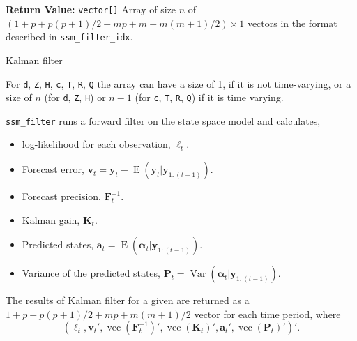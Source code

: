 \documentclass[]{book}
\providecommand{\tightlist}{%
  \setlength{\itemsep}{0pt}\setlength{\parskip}{0pt}}
\DeclareMathOperator{\E}{E}
\DeclareMathOperator{\Var}{Var}
\DeclareMathOperator{\VEC}{vec}
\newcommand{\mat}[1]{\boldsymbol{#1}}
\renewcommand{\vec}[1]{\boldsymbol{#1}}
\begin{document}
\textbf{Return Value:} \texttt{vector{[}{]}} Array of size \(n\) of
\((1 + p + p (p + 1) / 2 + mp + m + m (m + 1) / 2) \times 1\) vectors in
the format described in \texttt{ssm\_filter\_idx}.

Kalman filter

For \texttt{d}, \texttt{Z}, \texttt{H}, \texttt{c}, \texttt{T},
\texttt{R}, \texttt{Q} the array can have a size of 1, if it is not
time-varying, or a size of \(n\) (for \texttt{d}, \texttt{Z},
\texttt{H}) or \(n - 1\) (for \texttt{c}, \texttt{T}, \texttt{R},
\texttt{Q}) if it is time varying.

\texttt{ssm\_filter} runs a forward filter on the state space model and
calculates,

\begin{itemize}
\tightlist
\item
  log-likelihood for each observation, \(\ell_t\).
\item
  Forecast error,
  \(\vec{v}_t = \vec{y}_t - \E(\vec{y}_t | \vec{y}_{1:(t -1)})\).
\item
  Forecast precision, \(\mat{F}^{-1}_t\).
\item
  Kalman gain, \(\mat{K}_t\).
\item
  Predicted states,
  \(\vec{a}_t = \E(\vec{\alpha}_t | \vec{y}_{1:(t -1)})\).
\item
  Variance of the predicted states,
  \(\mat{P}_t = \Var(\vec{\alpha}_t | \vec{y}_{1:(t -1)})\).
\end{itemize}

The results of Kalman filter for a given are returned as a
\(1 + p + p (p + 1) / 2 + m p + m (m + 1) / 2\) vector for each time
period, where \[
(\ell_t, \vec{v}_t', \VEC(\mat{F}^{-1}_t)', \VEC(\mat{K}_t)', \vec{a}_t', \VEC(\mat{P}_t)' )'.
\]
\end{document}
